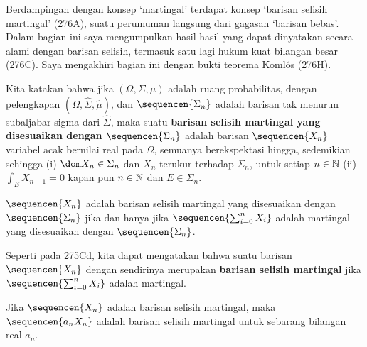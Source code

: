 
\def\chaptername{Teori probabilitas}
\def\sectionname{Barisan selisih martingal}


Berdampingan dengan konsep `martingal' terdapat konsep `barisan selisih
martingal' (276A), suatu perumuman langsung dari gagasan `barisan bebas'.
Dalam bagian ini saya mengumpulkan hasil-hasil yang dapat dinyatakan secara
alami dengan barisan selisih, termasuk satu lagi hukum kuat bilangan besar
(276C). Saya mengakhiri bagian ini dengan bukti teorema Koml\'os (276H).

 Kita katakan bahwa jika
$(\Omega,\Sigma,\mu)$ adalah ruang probabilitas, dengan pelengkapan
$(\Omega,\hat\Sigma,\hat\mu)$, dan $\sequencen{\Sigma_n}$ adalah
barisan tak menurun subaljabar-sigma dari $\hat\Sigma$, maka suatu
{\bf barisan selisih martingal yang disesuaikan dengan
$\sequencen{\Sigma_n}$} adalah barisan $\sequencen{X_n}$ variabel acak
bernilai real pada $\Omega$, semuanya berekspektasi hingga, sedemikian
sehingga (i) $\dom X_n\in\Sigma_n$ dan $X_n$ terukur terhadap
$\Sigma_n$, untuk setiap $n\in\Bbb N$ (ii) $\int_EX_{n+1}=0$ kapan pun
$n\in\Bbb N$ dan $E\in\Sigma_n$.

 $\sequencen{X_n}$ adalah barisan selisih martingal
yang disesuaikan dengan $\sequencen{\Sigma_n}$ jika dan hanya jika
$\sequencen{\sum_{i=0}^nX_i}$ adalah martingal yang disesuaikan dengan
$\sequencen{\Sigma_n}$.

Seperti pada 275Cd, kita dapat mengatakan bahwa suatu barisan
$\sequencen{X_n}$ dengan sendirinya merupakan {\bf barisan selisih
martingal} jika $\sequencen{\sum_{i=0}^nX_i}$ adalah martingal.

 Jika $\sequencen{X_n}$ adalah barisan selisih
martingal, maka $\sequencen{a_nX_n}$ adalah barisan selisih martingal
untuk sebarang bilangan real $a_n$.

